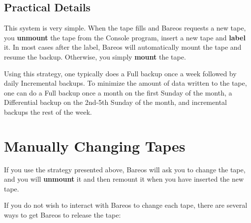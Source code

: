 \subsection{Practical Details}

This system is very simple. When the tape fills and Bareos requests a new
tape, you {\bf unmount} the tape from the Console program, insert a new tape
and {\bf label} it. In most cases after the label, Bareos will automatically
mount the tape and resume the backup. Otherwise, you simply {\bf mount} the
tape.

Using this strategy, one typically does a Full backup once a week followed by
daily Incremental backups. To minimize the amount of data written to the tape,
one can do a Full backup once a month on the first Sunday of the
month, a Differential backup on the 2nd-5th Sunday of the month, and
incremental backups the rest of the week.
\label{Manual}

\section{Manually Changing Tapes}

If you use the strategy presented above, Bareos will ask you to change the
tape, and you will {\bf unmount} it and then remount it when you have inserted
the new tape.

If you do not wish to interact with Bareos to change each tape, there are
several ways to get Bareos to release the tape:

